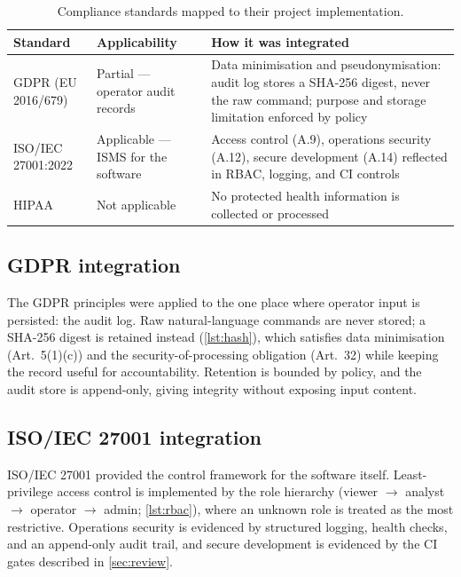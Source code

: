 \documentclass[10pt,journal,onecolumn]{IEEEtran}
\begin{document}
\begin{table}[htbp]
  \centering
  \footnotesize
  \begin{tabular}{@{}p{}p{}p{}@{}}
    \toprule
    \textbf{Standard} & \textbf{Applicability} & \textbf{How it was integrated}\\
    \midrule
    GDPR (EU 2016/679) & Partial --- operator audit records & Data minimisation and pseudonymisation: audit log stores a SHA-256 digest, never the raw command; purpose and storage limitation enforced by policy\\
    ISO/IEC 27001:2022 & Applicable --- ISMS for the software & Access control (A.9), operations security (A.12), secure development (A.14) reflected in RBAC, logging, and CI controls\\
    HIPAA & Not applicable & No protected health information is collected or processed\\
    \bottomrule
  \end{tabular}
  \caption{Compliance standards mapped to their project implementation.}\label{tab:compliance}
\end{table}

\subsection{GDPR integration}
The GDPR principles were applied to the one place where operator input is
persisted: the audit log. Raw natural-language commands are never stored;
a SHA-256 digest is retained instead (\cref{lst:hash}), which satisfies
data minimisation (Art.\ 5(1)(c)) and the security-of-processing
obligation (Art.\ 32) while keeping the record useful for
accountability. Retention is bounded by policy, and the audit store is
append-only, giving integrity without exposing input content.

\subsection{ISO/IEC 27001 integration}
ISO/IEC 27001 provided the control framework for the software itself.
Least-privilege access control is implemented by the role hierarchy
(viewer $\rightarrow$ analyst $\rightarrow$ operator $\rightarrow$ admin;
\cref{lst:rbac}), where an unknown role is treated as the most
restrictive. Operations security is evidenced by structured logging,
health checks, and an append-only audit trail, and secure development is
evidenced by the CI gates described in \cref{sec:review}.
\end{document}
